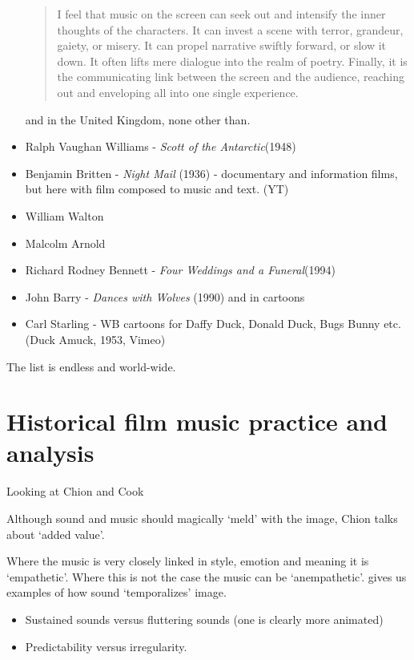 \begin{itemize}
\begin{quotation}
I feel that music on the screen can seek out and intensify the inner thoughts of the characters. It can invest a scene with terror, grandeur, gaiety, or misery. It can propel narrative swiftly forward, or slow it down. It often lifts mere dialogue into the realm of poetry. Finally, it is the communicating link between the screen and the audience, reaching out and enveloping all into one single experience.
\end{quotation}

and in the United Kingdom, none other than.

\item Ralph Vaughan Williams - \textit{Scott of the Antarctic}(1948)
\item Benjamin Britten - \textit{Night Mail} (1936) - documentary and information films, but here with film composed to music and text. (YT)
\item William Walton
\item Malcolm Arnold
\item Richard Rodney Bennett - \textit{Four Weddings and a Funeral}(1994)
\item John Barry - \textit{Dances with Wolves} (1990)
and in cartoons

\item Carl Starling - WB cartoons for Daffy Duck, Donald Duck, Bugs Bunny etc. (Duck Amuck, 1953,  Vimeo) 
\end{itemize}

The list is endless and world-wide. 


\section{Historical film music practice and analysis}

Looking at Chion \citeyearpar{chion1990} and Cook \citeyearpar{cook1998analysing}

Although sound and music should magically `meld' with the image, Chion talks about `added value'. 

Where the music is very closely linked in style, emotion and meaning it is `empathetic'. Where this is not the case the music can be `anempathetic'. 
\citep[14-15]{chion1990} gives us examples of how sound `temporalizes' image.
\begin{itemize}
\item Sustained sounds versus fluttering sounds (one is clearly more animated)
\item Predictability versus irregularity. 
\end{itemize}

